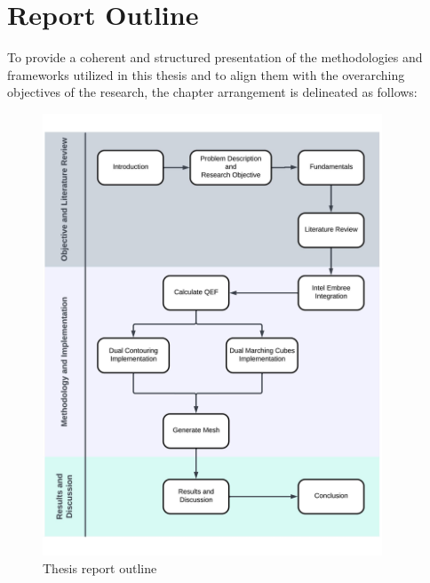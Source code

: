 \section{Report Outline}
To provide a coherent and structured presentation of the methodologies and frameworks utilized in this thesis and to align them with the overarching objectives of the research, the chapter arrangement is delineated as follows:

\begin{figure}[ht!]
    \centering
    \includegraphics[width=0.9\textwidth]{Figures/Thesis-Report-Outline.jpeg}
    \decoRule
    \caption{Thesis report outline}
    \label{fig:Thesis-Report-Outline}
\end{figure}
